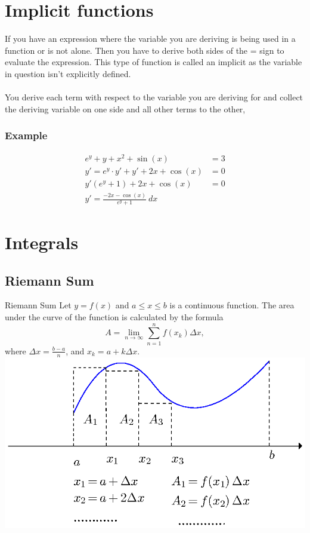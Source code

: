 \documentclass[letterpaper,10pt,twoside,twocolumn,openany]{book}
\begin{document}
\section{Implicit functions}
If you have an expression where the variable you are deriving is being used in a function or is not alone. Then you have to derive both sides of the = sign to evaluate the expression. This type of function is called an implicit as the variable in question isn't explicitly defined. 
\\~\\ 
You derive each term with respect to the variable you are deriving for and collect the deriving variable on one side and all other terms to the other,
\subsubsection{Example}
\begin{align*}
    e^y + y + x^2 + \sin(x) &= 3\\
    y' = e^y\cdot y' + y' + 2x + \cos(x) &= 0\\
    y'(e^y + 1)+ 2x + \cos(x) &= 0\\
    y' = \frac{-2x - \cos(x)}{e^y + 1}\ dx
\end{align*}
\newpage

\section{Integrals} 
\subsection{Riemann Sum}
\begin{DndSidebar}{Riemann Sum}
    Let $y = f ( x)$ and $a \leq x \leq b$ is a continuous function. The area under the curve of the function is calculated by the formula
    \[ A = \lim_{n \rightarrow \infty} \sum_{n = 1}^n f ( x_k) \Delta x, \]
    where $\Delta x = \frac{b - a}{n}$, and $x_k = a + k \Delta x$.
    \includegraphics[scale=0.8]{supplement-2.eps}
\end{DndSidebar}
\end{document}
